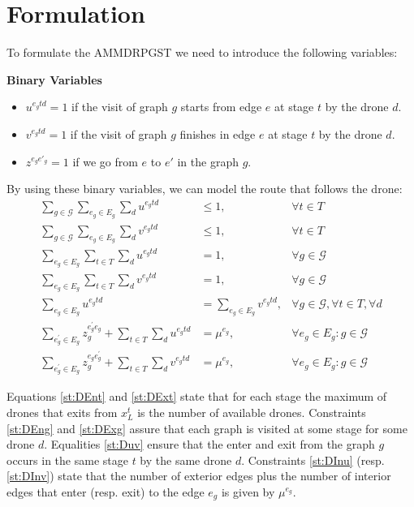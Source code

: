 \documentclass[10pt,a4paper]{article}
\newcommand{\LA}[1]{{\color{blue}#1}}
\begin{document}
\section{Formulation}
To formulate the AMMDRPGST we need to introduce the following variables:

\textbf{Binary Variables}
\begin{itemize}
  \item $u^{{e_g}td} = 1$ if the visit of graph $g$ starts from edge $e$ at stage $t$ by the drone $d$.
  \item $v^{{e_g}td}= 1$ if the visit of graph $g$ finishes in edge $e$ at stage $t$ by the drone $d$.
  \item $z^{e_ge'_g}= 1$ if we go from $e$ to $e'$ in the graph $g$.
\end{itemize}

By using these binary variables, we can model the route that follows the drone:
\begin{align}
    \sum_{g\in \mathcal G}\sum_{e_g\in E_g} \sum_d u^{e_gtd} & \leq 1, &\forall t\in T \label{st:DEnt}\\%
    \sum_{g\in\mathcal G}\sum_{e_g\in E_g} \sum_d v^{e_gtd} & \leq 1, &\forall t\in T \label{st:DExt}\\%
    \sum_{e_g\in E_g} \sum_{t\in T} \sum_{d} u^{e_gtd} & = 1, &\forall g\in\mathcal G \label{st:DEng}\\%
    \sum_{e_g\in E_g} \sum_{t\in T} \sum_{d} v^{e_gtd} & = 1, &\forall g\in\mathcal G \label{st:DExg}\\%
    \sum_{e_g\in E_g} u^{e_gtd} & = \sum_{e_g\in E_g} v^{e_gtd}, &\forall g\in\mathcal G, \forall t\in T, \forall d \label{st:Duv}\\%
    \sum_{e^\prime_g\in E_g} z_g^{e^\prime_ge_g} + \sum_{t\in T} \sum_{d} u^{e_gtd} & = \mu^{e_g}, &\forall e_g\in E_g:g\in\mathcal G \label{st:DInu}\\
    \sum_{e^\prime_g\in E_g} z_g^{e_ge^\prime_g} + \sum_{t\in T} \sum_{d} v^{e_gtd} & = \mu^{e_g}, &\forall e_g\in E_g:g\in\mathcal G \label{st:DInv}
\end{align}

Equations \eqref{st:DEnt} and \eqref{st:DExt} state that for each stage the maximum of drones that exits from $x_L^t$ is the number of available drones. Constraints \eqref{st:DEng} and \eqref{st:DExg} assure that each graph is visited at some stage for some drone $d$. Equalities \eqref{st:Duv} ensure that the enter and exit from the graph $g$ occurs in the same stage $t$ by the same drone $d$. Constraints \eqref{st:DInu} (resp. \eqref{st:DInv}) \LA{state} that the number of exterior edges plus the number of interior edges that enter (resp. exit) to the edge $e_g$ is given by $\mu^{e_g}$.
\end{document}
